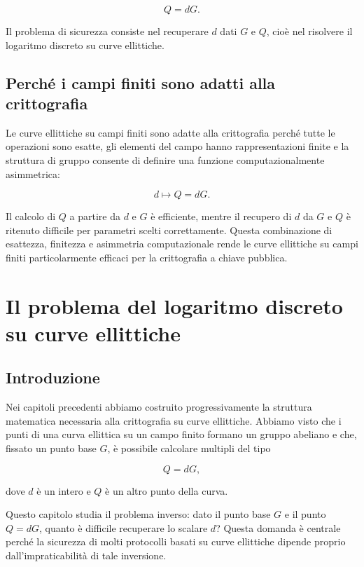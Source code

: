 \documentclass[12pt,a4paper,oneside]{report}
\begin{document}
\[
Q=dG.
\]

Il problema di sicurezza consiste nel recuperare \(d\) dati \(G\) e \(Q\), cioè nel risolvere il logaritmo discreto su curve ellittiche.

\section{Perché i campi finiti sono adatti alla crittografia}

Le curve ellittiche su campi finiti sono adatte alla crittografia perché tutte le operazioni sono esatte, gli elementi del campo hanno rappresentazioni finite e la struttura di gruppo consente di definire una funzione computazionalmente asimmetrica:

\[
d\longmapsto Q=dG.
\]

Il calcolo di \(Q\) a partire da \(d\) e \(G\) è efficiente, mentre il recupero di \(d\) da \(G\) e \(Q\) è ritenuto difficile per parametri scelti correttamente. Questa combinazione di esattezza, finitezza e asimmetria computazionale rende le curve ellittiche su campi finiti particolarmente efficaci per la crittografia a chiave pubblica.

\chapter{Il problema del logaritmo discreto su curve ellittiche}

\section{Introduzione}

Nei capitoli precedenti abbiamo costruito progressivamente la struttura matematica necessaria alla crittografia su curve ellittiche. Abbiamo visto che i punti di una curva ellittica su un campo finito formano un gruppo abeliano e che, fissato un punto base \(G\), è possibile calcolare multipli del tipo

\[
Q = dG,
\]

dove \(d\) è un intero e \(Q\) è un altro punto della curva.

Questo capitolo studia il problema inverso: dato il punto base \(G\) e il punto \(Q=dG\), quanto è difficile recuperare lo scalare \(d\)? Questa domanda è centrale perché la sicurezza di molti protocolli basati su curve ellittiche dipende proprio dall'impraticabilità di tale inversione.
\end{document}
